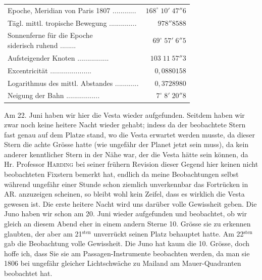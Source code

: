\begin{center}\fontsize{9}{11}\selectfont\setlength{\tabcolsep}{3pt}\renewcommand{\arraystretch}{1.15}\begin{tabular}{lr}
Epoche, Meridian von Paris 1807 .\;.\;.\;.\;.\;.\;.\;.\;.\;.\;.\;.\; & $168^\circ\;10'\;47''6$\\
Tägl. mittl. tropische Bewegung .\;.\;.\;.\;.\;.\;.\;.\;.\;.\;.\;.\;.\;.\; & $978''8588$\\
\shortstack[l]{Sonnenferne für die Epoche\\siderisch ruhend} .\;.\;.\;.\;.\;.\;.\;.\; & $69^\circ\;57'\;6''5$\\
Aufsteigender Knoten .\;.\;.\;.\;.\;.\;.\;.\;.\;.\;.\;.\;.\;.\;.\;.\; & $103\;11\;57''3$\\
Excentricität .\;.\;.\;.\;.\;.\;.\;.\;.\;.\;.\;.\;.\;.\;.\;.\;.\;.\;.\;.\;.\; & $0{,}0880158$\\
Logarithmus des mittl. Abstandes .\;.\;.\;.\;.\;.\;.\;.\;.\;.\;.\;.\; & $0{,}3728980$\\
Neigung der Bahn .\;.\;.\;.\;.\;.\;.\;.\;.\;.\;.\;.\;.\;.\;.\;.\;.\; & $7^\circ\;8'\;20''8$\\
\end{tabular}\end{center}


\par\indent Am 22. Juni haben wir hier die Vesta wieder aufgefunden. Seitdem haben wir zwar noch
keine heitere Nacht wieder gehabt; indess da der beobachtete Stern fast genau auf dem
Platze stand, wo die Vesta erwartet werden musste, da dieser Stern die achte Grösse
hatte (wie ungefähr der Planet jetzt sein muss), da kein anderer kenntlicher Stern in
der Nähe war, der die Vesta hätte sein können, da Hr. Professor \textsc{Harding} bei seiner
frühern Revision dieser Gegend hier keinen nicht beobachteten Fixstern bemerkt hat,
endlich da meine Beobachtungen selbst während ungefähr einer Stunde schon ziemlich
unverkennbar das Fortrücken in AR. anzuzeigen scheinen, so bleibt wohl kein Zeifel,
dass es wirklich die Vesta gewesen ist. Die erste heitere Nacht wird uns darüber volle
Gewissheit geben. Die Juno haben wir schon am 20. Juni wieder aufgefunden und
beobachtet, ob wir gleich an diesem Abend eher in einem andern Sterne 10. Grösse sie
zu erkennen glaubten, der aber am 21$^{\text{sten}}$ unverrückt seinen Platz behauptet
hatte. Am 22$^{\text{sten}}$ gab die Beobachtung volle Gewissheit. Die Juno hat kaum
die 10. Grösse, doch hoffe ich, dass Sie sie am Passagen-Instrumente beobachten werden,
da man sie 1806 bei ungefähr gleicher Lichtschwäche zu Mailand am Mauer-Quadranten
beobachtet hat.

